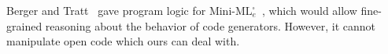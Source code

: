 Berger and Tratt~\cite{martin2015HGRTMP} gave program logic for
\(\text{Mini-ML}^\square_e\)~\cite{DaviesPfenning01JACM}, which would
allow fine-grained reasoning about the behavior of code generators.
However, it cannot manipulate open code which ours can deal with.


